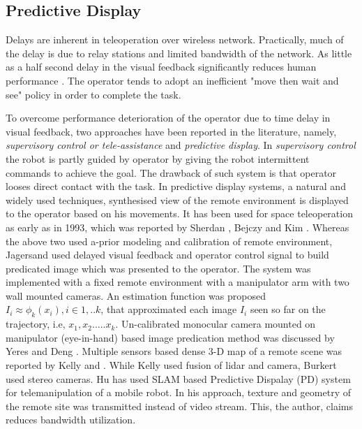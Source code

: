 \subsection{Predictive Display}
Delays are inherent in teleoperation over wireless network. Practically, much of the delay is due to relay stations and limited  bandwidth of the network.  As little as a half second delay in the visual feedback significantly reduces human performance \cite{chen2007human}. The operator tends to adopt an inefficient "move then wait and see" policy in order to complete the task.

To overcome performance deterioration of the operator due to time delay in visual feedback, two approaches have been reported in the literature, namely, \textit{supervisory control or tele-assistance  } and \textit{predictive display}. In \textit{supervisory control} \cite{sheridan1986human,pook1994teleassistance,jagersand1995visual} the robot is partly guided by operator by giving the robot intermittent commands to achieve the goal. The drawback of such system is that operator looses direct contact with the task.
In  predictive display systems, a natural and widely used techniques, synthesised view of the remote environment is displayed to the operator based on his movements. It has been used for space teleoperation as early as in 1993, which was reported by Sherdan \cite{sheridan1993space}, Bejczy \cite{bejczy1990predictive} and Kim \cite{kim1993demonstration}. Whereas the above two used a-prior modeling and  calibration of remote environment, Jagersand \cite{jagersand1999image} used delayed visual feedback and operator control signal to build predicated image which was presented to the operator. The system was implemented with a fixed remote environment with a manipulator arm with  two wall mounted cameras. An estimation function was proposed 
$I_i \approx \phi_k(x_i), i \in {1,..k}$, that approximated each image  $I_i$ seen so far on the trajectory, i.e, ${x_1, x_2 .....x_k}$. Un-calibrated monocular camera mounted on manipulator (eye-in-hand) based image predication method was discussed   by Yeres \cite{yerex2003predictive} and Deng \cite{deng2003predictive}. Multiple sensors based dense 3-D  map of a remote scene was reported by Kelly \cite{kelly2011real} and \cite{burkert2004photorealistic}. While Kelly used fusion of  lidar and  camera,  Burkert used stereo cameras. Hu \cite{hu2015line} has used SLAM based Predictive Dispalay  (PD) system for telemanipulation of a mobile robot. In his approach, texture and geometry of the remote site was transmitted instead of  video stream. This, the author, claims reduces bandwidth utilization.







